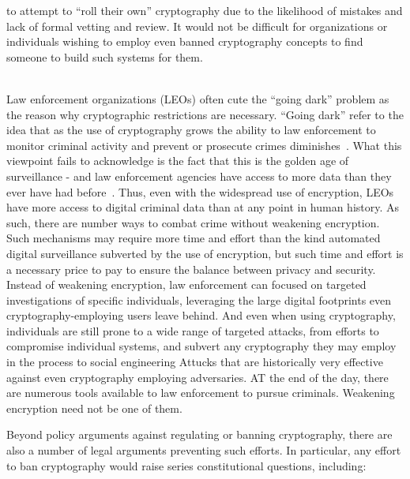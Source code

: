 \begin{packed_desc}
{    to attempt to ``roll their own'' cryptography due to the
    likelihood of mistakes and lack of formal vetting and review.} It
  would not be difficult for organizations or individuals wishing to
  employ even banned cryptography concepts to find someone to build
  such systems for them.
\item[Better Options] \hfill \\ Law enforcement organizations (LEOs)
  often cute the ``going dark'' problem as the reason why
  cryptographic restrictions are necessary. ``Going dark'' refer to
  the idea that as the use of cryptography grows the ability to law
  enforcement to monitor criminal activity and prevent or prosecute
  crimes diminishes~\cite{anderson2013}. What this viewpoint fails to
  acknowledge is the fact that this is the golden age of surveillance
  - and law enforcement agencies have access to more data than they
  ever have had before~\cite{swire2011}. Thus, even with the
  widespread use of encryption, LEOs have more access to digital
  criminal data than at any point in human history. As such, there are
  number ways to combat crime without weakening encryption. Such
  mechanisms may require more time and effort than the kind automated
  digital surveillance subverted by the use of encryption, but such
  time and effort is a necessary price to pay to ensure the balance
  between privacy and security. Instead of weakening encryption, law
  enforcement can focused on targeted investigations of specific
  individuals, leveraging the large digital footprints even
  cryptography-employing users leave behind. And even when using
  cryptography, individuals are still prone to a wide range of
  targeted attacks, from efforts to compromise individual systems, and
  subvert any cryptography they may employ in the process to social
  engineering Attucks that are historically very effective against
  even cryptography employing adversaries. AT the end of the day,
  there are numerous tools available to law enforcement to pursue
  criminals. Weakening encryption need not be one of them.
\end{packed_desc}

Beyond policy arguments against regulating or banning cryptography, there
are also a number of legal arguments preventing such efforts. In
particular, any effort to ban cryptography would raise series
constitutional questions, including:


